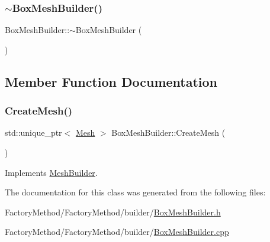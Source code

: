 \mbox{\label{class_box_mesh_builder_a15ba61afdc9e03c8b8db90df1f231041}} 
\subsubsection{\texorpdfstring{$\sim$BoxMeshBuilder()}{~BoxMeshBuilder()}}
{\footnotesize\ttfamily Box\+Mesh\+Builder\+::$\sim$\+Box\+Mesh\+Builder (\begin{DoxyParamCaption}{ }\end{DoxyParamCaption})}



\subsection{Member Function Documentation}
\mbox{\label{class_box_mesh_builder_a3c5a331f00e2bec89baff4711e0d2dc4}} 
\subsubsection{\texorpdfstring{CreateMesh()}{CreateMesh()}}
{\footnotesize\ttfamily std\+::unique\+\_\+ptr$<$ \mbox{\hyperlink{class_mesh}{Mesh}} $>$ Box\+Mesh\+Builder\+::\+Create\+Mesh (\begin{DoxyParamCaption}{ }\end{DoxyParamCaption})\hspace{0.3cm}{\ttfamily [virtual]}}



Implements \mbox{\hyperlink{class_mesh_builder_a41cfd23b93c25bc016c889c2c67a2637}{Mesh\+Builder}}.



The documentation for this class was generated from the following files\+:\begin{DoxyCompactItemize}
\item 
Factory\+Method/\+Factory\+Method/builder/\mbox{\hyperlink{_box_mesh_builder_8h}{Box\+Mesh\+Builder.\+h}}\item 
Factory\+Method/\+Factory\+Method/builder/\mbox{\hyperlink{_box_mesh_builder_8cpp}{Box\+Mesh\+Builder.\+cpp}}\end{DoxyCompactItemize}
